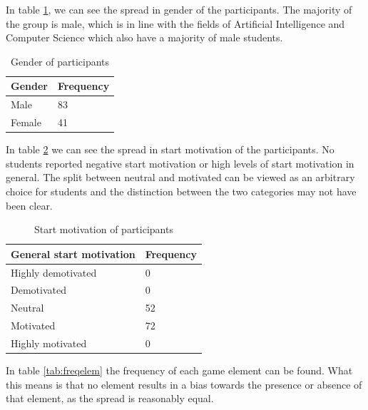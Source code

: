\documentclass[11pt]{article}
\newcommand{\ra}[1]{\renewcommand{\arraystretch}{#1}}
\begin{document}
In table \ref{tab:gender}, we can see the spread in gender of the participants. The majority of the group is male, which is in line with the fields of Artificial Intelligence and Computer Science which also have a majority of male students. 
\begin{table}[h!t]
  \centering
  \ra{1.3}
\footnotesize
  \begin{tabular}{@{}ll@{}}
  \toprule
  Gender & Frequency \\
  \midrule
  Male & 83 \\
  Female & 41 \\
  \bottomrule
  \end{tabular}
  \caption{Gender of participants}
\label{tab:gender}
\end{table}

In table \ref{tab:motivation} we can see the spread in start motivation of the participants. No students reported negative start motivation or high levels of start motivation in general. The split between neutral and motivated can be viewed as an arbitrary choice for students and the distinction between the two categories may not have been clear.

\begin{table}[h!t]
  \centering
  \ra{1.3}
\footnotesize
  \begin{tabular}{@{}ll@{}}
  \toprule
  General start motivation & Frequency \\ 
  \midrule
  Highly demotivated & 0 \\
  Demotivated & 0 \\
  Neutral & 52 \\
  Motivated & 72 \\
  Highly motivated & 0 \\
  \bottomrule
  \end{tabular}
  \caption{Start motivation of participants}
\label{tab:motivation}
\end{table}

In table \ref{tab:freqelem} the frequency of each game element can be found. What this means is that no element results in a bias towards the presence or absence of that element, as the spread is reasonably equal.
\end{document}
